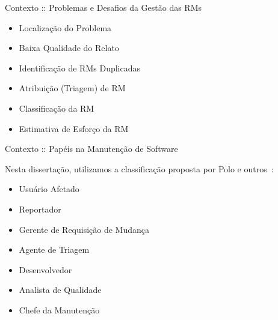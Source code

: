 \documentclass[t,14pt,mathserif]{beamer}
\begin{document}



\begin{frame}{Contexto :: Problemas e Desafios da Gestão das RMs}
	\begin{itemize}

        \item Localização do Problema
        \item Baixa Qualidade do Relato
        \item Identificação de RMs Duplicadas
        \item Atribuição (Triagem) de RM
        \item Classificação da RM
        \item Estimativa de Esforço da RM

	\end{itemize}
\end{frame}

\begin{frame}{Contexto :: Papéis na Manutenção de Software}

    Nesta dissertação, utilizamos a classificação proposta por Polo e
    outros~\cite{Polo1999}:

	\begin{itemize}
        \item Usuário Afetado
        \item Reportador
        \item Gerente de Requisição de Mudança
        \item Agente de Triagem
        \item Desenvolvedor
        \item Analista de Qualidade
        \item Chefe da Manutenção
    \end{itemize}

\end{frame}
\end{document}
